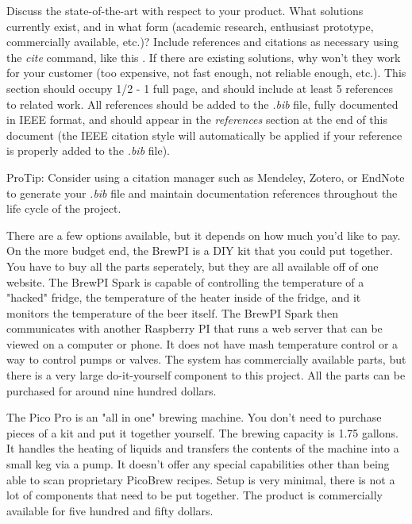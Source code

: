 Discuss the state-of-the-art with respect to your product. What solutions currently exist, and in what form (academic research, enthusiast prototype, commercially available, etc.)? Include references and citations as necessary using the \textit{cite} command, like this \cite{Rubin2012}. If there are existing solutions, why won't they work for your customer (too expensive, not fast enough, not reliable enough, etc.). This section should occupy 1/2 - 1 full page, and should include at least 5 references to related work. All references should be added to the \textit{.bib} file, fully documented in IEEE format, and should appear in the \textit{references} section at the end of this document (the IEEE citation style will automatically be applied if your reference is properly added to the \textit{.bib} file).

ProTip: Consider using a citation manager such as Mendeley, Zotero, or EndNote to generate your \textit{.bib} file and maintain documentation references throughout the life cycle of the project.

\vspace{5mm}

There are a few options available, but it depends on how much you'd like to pay.
On the more budget end, the BrewPI is a DIY kit that you could put together. You
have to buy all the parts seperately, but they are all available off of one
website. The BrewPI Spark is capable of controlling the temperature of a
"hacked" fridge, the temperature of the heater inside of the fridge, and it
monitors the temperature of the beer itself. The BrewPI Spark then communicates
with another Raspberry PI that runs a web server that can be viewed on a
computer or phone. It does not have mash temperature control or a way to control
pumps or valves. The system has commercially available parts, but there is a
very large do-it-yourself component to this project. All the parts can be
purchased for around nine hundred dollars. \cite{Jacobs_2017} 

The Pico Pro is an "all in one" brewing machine. You don't need to purchase
pieces of a kit and put it together yourself. The brewing capacity is 1.75
gallons. It handles the heating of liquids
and transfers the contents of the machine into a small keg via a pump. It
doesn't offer any special capabilities other than being able to scan proprietary
PicoBrew recipes. Setup is very minimal, there is not a lot of components that
need to be put together. The product is commercially available for five hundred
and fifty dollars. \cite{Pico_2021}

